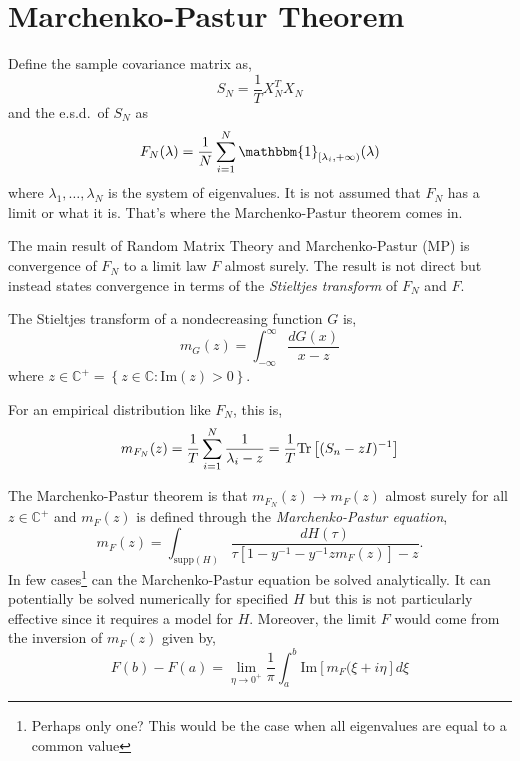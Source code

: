 \documentclass{article}
\begin{document}
\section{Marchenko-Pastur Theorem}

Define the sample covariance matrix as,
\begin{equation}\label{eq:sample_cov}
	S_N = \frac1T X_N^T X_N
\end{equation}
and the e.s.d.\ of $S_N$ as
\begin{equation}\label{eq:F_N}
	F_N(\lambda)
		 = \frac{1}{N}\sum_{i=1}^N \mathbbm{1}_{[\lambda_{i}, +\infty)}(\lambda)
\end{equation}
where $\lambda_{1}, \ldots, \lambda_N$ is the system of eigenvalues.  It is not
assumed that $F_N$ has a limit or what it is.  That's where the Marchenko-Pastur
theorem comes in.

The main result of Random Matrix Theory and Marchenko-Pastur (MP) is convergence
of $F_N$ to a limit law $F$ almost surely. The result is not direct but instead
states convergence in terms of the \emph{Stieltjes transform} of $F_N$ and $F$.

The Stieltjes transform of a nondecreasing function $G$ is,
\begin{equation}\label{eq:stieltjes}
	m_G(z) = \int_{-\infty}^\infty \frac{dG(x)}{x - z}
\end{equation}
where $z \in \mathbb{C}^+ = \left\{ z \in \mathbb{C}: \mathrm{Im}(z) >
0\right\}$.

For an empirical distribution like $F_N$, this is,
\begin{equation}\label{eq:empirical_stieltjes}
	m_{F_N}(z)
		 = \frac1T \sum_{i=1}^N \frac{1}{\lambda_{i} - z}
		 = \frac1T \mathrm{Tr}\left[(S_n - zI)^{-1}\right]
\end{equation}

The Marchenko-Pastur theorem is that $m_{F_N}(z) \rightarrow m_{F}(z)$ almost
surely for all $z \in \mathbb{C}^+$ and $m_{F}(z)$ is defined through the \emph
{Marchenko-Pastur equation},
\begin{equation}\label{eq:mp_equation}
	m_F(z) = \int_{\mathrm{supp}(H)}
			 \frac{dH(\tau)}{\tau\left[1 - y^{-1} - y^{-1}z m_F(z) \right] - z}.
\end{equation}
In few cases\footnote{Perhaps only one?  This would be the case when all
eigenvalues are equal to a common value} can the Marchenko-Pastur equation be
solved analytically.  It can potentially be solved numerically for specified $H$
but this is not particularly effective since it requires a model for $H$.
Moreover, the limit $F$ would come from the inversion of $m_F(z)$ given by,
$$
	F(b) - F(a) = \lim_{\eta \rightarrow0^+} 
			\frac1\pi \int_a^b \mathrm{Im}\left[ m_F(\xi + i\eta\right] d\xi
$$
\end{document}
